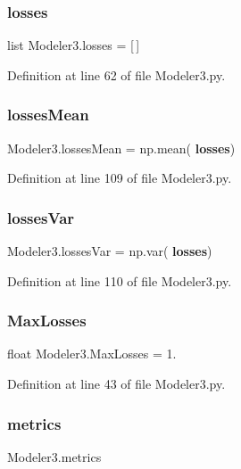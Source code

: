 \subsubsection{losses}
{\footnotesize\ttfamily list Modeler3.\+losses = [$\,$]}



Definition at line 62 of file Modeler3.\+py.

\mbox{\label{namespace_modeler3_a0032de74d12d63c294e8fea6501b3a1b}} 
\subsubsection{losses\+Mean}
{\footnotesize\ttfamily Modeler3.\+losses\+Mean = np.\+mean(\textbf{ losses})}



Definition at line 109 of file Modeler3.\+py.

\mbox{\label{namespace_modeler3_ab3e42d20801a10b414607703f92f49d6}} 
\subsubsection{losses\+Var}
{\footnotesize\ttfamily Modeler3.\+losses\+Var = np.\+var(\textbf{ losses})}



Definition at line 110 of file Modeler3.\+py.

\mbox{\label{namespace_modeler3_a22ab886185e788367baa5eaf026760a0}} 
\subsubsection{Max\+Losses}
{\footnotesize\ttfamily float Modeler3.\+Max\+Losses = 1.}



Definition at line 43 of file Modeler3.\+py.

\mbox{\label{namespace_modeler3_a06e769dfb38288ce1b11ccab75c709cb}} 
\subsubsection{metrics}
{\footnotesize\ttfamily Modeler3.\+metrics}



